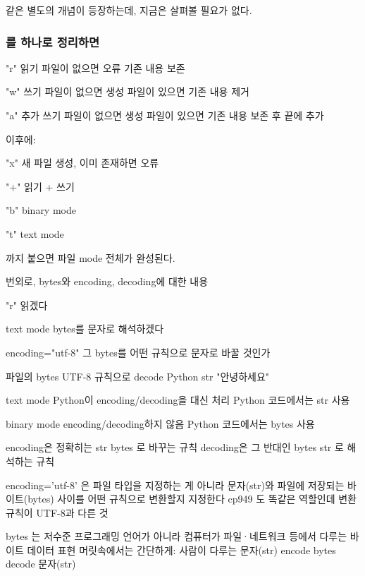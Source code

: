 같은 별도의 개념이 등장하는데, 지금은 살펴볼 필요가 없다.

\subsubsection{를 하나로 정리하면}

\begin{dhksmry}
    "r"
    읽기
    파일이 없으면 \ra 오류
    기존 내용 보존


    "w"
    쓰기
    파일이 없으면 \ra 생성
    파일이 있으면 \ra 기존 내용 제거
    
    
    "a"
    추가 쓰기
    파일이 없으면 \ra 생성
    파일이 있으면 \ra 기존 내용 보존 후 끝에 추가
\end{dhksmry}

이후에:

\begin{dhksmry}
    "x" 새 파일 생성, 이미 존재하면 오류


    "+" 읽기 + 쓰기


    "b" binary mode


    "t" text mode
\end{dhksmry}

까지 붙으면 파일 mode 전체가 완성된다.

\begin{dhksmry}[centered]
    번외로, bytes와 encoding, decoding에 대한 내용

    "r"
    \da
    읽겠다

    text mode
    \da
    bytes를 문자로 해석하겠다



    encoding="utf-8"
    \da
    그 bytes를 어떤 규칙으로 문자로 바꿀 것인가


    파일의 bytes
    \da
    UTF-8 규칙으로 decode
    \da
    Python str
    "안녕하세요"


    text mode
    \ra Python이 encoding/decoding을 대신 처리
    \ra Python 코드에서는 str 사용

    binary mode
    \ra encoding/decoding하지 않음
    \ra Python 코드에서는 bytes 사용


    encoding은 정확히는 str \ra bytes 로 바꾸는 규칙
    decoding은 그 반대인 bytes \ra str 로 해석하는 규칙


    encoding='utf-8' 은 파일 타입을 지정하는 게 아니라
    문자(str)와 파일에 저장되는 바이트(bytes) 사이를 
    어떤 규칙으로 변환할지 지정한다
    cp949 도 똑같은 역할인데 변환 규칙이 UTF-8과 다른 것


    bytes 는 저수준 프로그래밍 언어가 아니라 
    컴퓨터가 파일·네트워크 등에서 다루는 바이트 데이터 표현
    머릿속에서는 간단하게:
    사람이 다루는 문자(str) \ra encode \ra bytes \ra decode \ra 문자(str)
\end{dhksmry}

